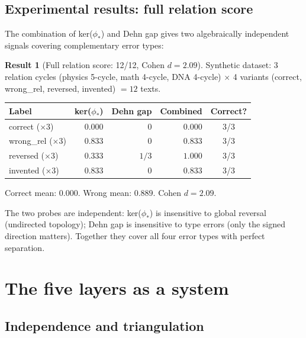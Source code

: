 \documentclass[11pt]{amsart}
\theoremstyle{definition}
\newtheorem{result}[theorem]{Result}
\begin{document}
\subsection{Experimental results: full relation score}

The combination of ker($\phi_*$) and Dehn gap gives two algebraically
independent signals covering complementary error types:

\begin{result}[Full relation score: 12/12, Cohen $d = 2.09$]
\label{result:rel-nerve}
Synthetic dataset: 3 relation cycles (physics 5-cycle, math 4-cycle,
DNA 4-cycle) $\times$ 4 variants (correct, wrong\_rel, reversed, invented)
$= 12$ texts.
\begin{center}
\begin{tabular}{@{}lrrrc@{}}
\toprule
Label & ker($\phi_*$) & Dehn gap & Combined & Correct? \\
\midrule
correct ($\times 3$) & $0.000$ & $0$ & $0.000$ & 3/3 \\
wrong\_rel ($\times 3$) & $0.833$ & $0$ & $0.833$ & 3/3 \\
reversed ($\times 3$) & $0.333$ & $1/3$ & $1.000$ & 3/3 \\
invented ($\times 3$) & $0.833$ & $0$ & $0.833$ & 3/3 \\
\bottomrule
\end{tabular}
\end{center}
Correct mean: $0.000$. Wrong mean: $0.889$.
Cohen $d = 2.09$.
\end{result}

The two probes are independent:
ker($\phi_*$) is insensitive to global reversal (undirected topology);
Dehn gap is insensitive to type errors (only the signed direction matters).
Together they cover all four error types with perfect separation.

\section{The five layers as a system}
\label{sec:system}

\subsection{Independence and triangulation}
\end{document}
